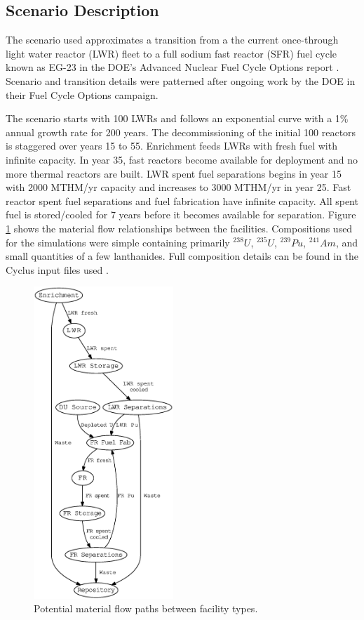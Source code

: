 \documentclass{style}
\begin{document}
\subsection{Scenario Description}

The scenario used approximates a transition from a the current once-through light water
reactor (LWR) fleet to a full sodium fast reactor (SFR) fuel cycle known as
EG-23 in the DOE's Advanced Nuclear Fuel Cycle Options report
\cite{wigeland_nuclear_2014}. Scenario and transition details were patterned
after ongoing work by the DOE in their Fuel Cycle Options campaign.

The scenario starts with 100 LWRs and follows an exponential curve with a 1\%
annual growth rate for 200 years.  The decommissioning of the initial 100
reactors is staggered over years 15 to 55.  Enrichment feeds LWRs with fresh
fuel with infinite capacity. In year 35, fast reactors become available for
deployment and no more thermal reactors are built.  LWR spent fuel separations
begins in year 15 with 2000 MTHM/yr capacity and increases to 3000 MTHM/yr in
year 25.  Fast reactor spent fuel separations and fuel fabrication have
infinite capacity.  All spent fuel is stored/cooled for 7 years before it becomes
available for separation. Figure \ref{fig:flow} shows the material flow
relationships between the facilities.  Compositions used for the simulations
were simple containing primarily $^{238}U$, $^{235}U$, $^{239}Pu$, $^{241}Am$,
and small quantities of a few lanthanides.  Full composition details can be
found in the Cyclus input files used \cite{Carlsen2015}.

\begin{figure}[!h]
    \centering
    \includegraphics[width=0.47\textwidth]{exp2/flow.eps}
    \caption[Material flow paths]{Potential material flow paths between facility types.}
    \label{fig:flow}
\end{figure}
\end{document}
